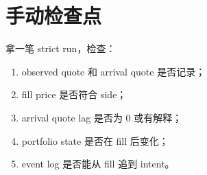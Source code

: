 \section{手动检查点}

拿一笔 strict run，检查：

\begin{enumerate}[leftmargin=2em]
  \item observed quote 和 arrival quote 是否记录；
  \item fill price 是否符合 side；
  \item arrival quote lag 是否为 0 或有解释；
  \item portfolio state 是否在 fill 后变化；
  \item event log 是否能从 fill 追到 intent。
\end{enumerate}

